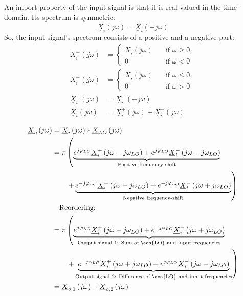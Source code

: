 \begin{refsection}
An import property of the input signal is that it is real-valued in the time-domain. Its spectrum is symmetric:
\begin{equation}
	\underline{X}_{i}\left(j\omega\right) = \overline{\underline{X}_{i}\left(-j\omega\right)}
\end{equation}
So, the input signal's spectrum consists of a positive and a negative part:
\begin{equation}
	\begin{split}
		\underline{X}_{i}^{+}\left(j\omega\right) &= \begin{cases} \underline{X}_{i}\left(j\omega\right) &\quad \text{if } \omega \geq 0,\\ 0  &\quad \text{if } \omega < 0\end{cases} \\
		\underline{X}_{i}^{-}\left(j\omega\right) &= \begin{cases} \underline{X}_{i}\left(j\omega\right) &\quad \text{if } \omega \leq 0,\\ 0  &\quad \text{if } \omega > 0\end{cases} \\
		\underline{X}_{i}^{+}\left(j\omega\right) &= \overline{\underline{X}_{i}^{-}\left(-j\omega\right)} \\
		\underline{X}_{i}\left(j\omega\right) &= \underline{X}_{i}^{+}\left(j\omega\right) + \underline{X}_{i}^{-}\left(j\omega\right)
	\end{split}
\end{equation}

\begin{equation}
	\begin{split}
		\underline{X}_{o}\left(j\omega\right) &= \underline{X}_{i}\left(j\omega\right) * \underline{X}_{LO}\left(j\omega\right) \\
		 &= \pi \left( \underbrace{e^{j \varphi_{LO}} \underline{X}_{i}^{+}\left(j\omega - j \omega_{LO}\right) + e^{j \varphi_{LO}} \underline{X}_{i}^{-}\left(j\omega - j \omega_{LO}\right) }_{\text{Positive frequency-shift}} \right. \\ & \qquad \left. + \underbrace{e^{-j \varphi_{LO}} \underline{X}_{i}^{+}\left(j\omega + j \omega_{LO}\right) + e^{-j \varphi_{LO}} \underline{X}_{i}^{-}\left(j\omega + j \omega_{LO}\right)}_{\text{Negative frequency-shift}} \right) \\
		 &\quad \text{Reordering:} \\
		 &= \pi \left( \underbrace{e^{j \varphi_{LO}} \underline{X}_{i}^{+}\left(j\omega - j \omega_{LO}\right) + e^{-j \varphi_{LO}} \underline{X}_{i}^{-}\left(j\omega + j \omega_{LO}\right) }_{\text{Output signal 1: Sum of \acs{LO} and input frequencies}} \right. \\ & \qquad \left. + \underbrace{e^{-j \varphi_{LO}} \underline{X}_{i}^{+}\left(j\omega + j \omega_{LO}\right) + e^{j \varphi_{LO}} \underline{X}_{i}^{-}\left(j\omega - j \omega_{LO}\right)}_{\text{Output signal 2: Difference of \acs{LO} and input frequencies}} \right) \\
		 &= \underline{X}_{o,1}\left(j\omega\right) + \underline{X}_{o,2}\left(j\omega\right)
	\end{split}
\end{equation}


\end{refsection}
